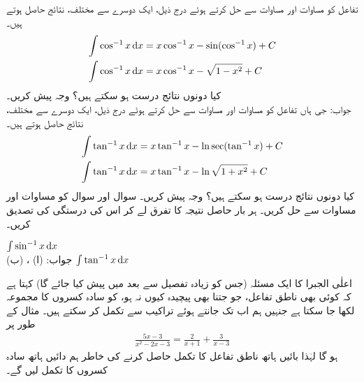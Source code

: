 تفاعل  کو مساوات  اور مساوات  سے حل کرتے ہوئے درج ذیل، ایک دوسرے سے مختلف، نتائج حاصل ہوتے ہیں۔
\begin{gather}
\begin{aligned}
\int \cos^{-1}x\dif x&=x\cos^{-1}x-\sin(\cos^{-1} x)+C\\
\int \cos^{-1}x\dif x&=x\cos^{-1}x-\sqrt{1-x^2}+C
\end{aligned}
\end{gather}
کیا دونوں نتائج درست ہو سکتے ہیں؟ وجہ پیش کریں۔\\
جواب:\quad
جی ہاں
تفاعل  کو مساوات  اور مساوات  سے حل کرتے ہوئے درج ذیل، ایک دوسرے سے مختلف، نتائج حاصل ہوتے ہیں۔
\begin{gather}
\begin{aligned}
\int \tan^{-1}x\dif x&=x\tan^{-1}x-\ln\sec(\tan^{-1}x)+C\\
\int \tan^{-1}x\dif x&=x\tan^{-1}x-\ln{\sqrt{1+x^2}}+C
\end{aligned}
\end{gather}
کیا دونوں نتائج درست ہو سکتے ہیں؟ وجہ پیش کریں۔
سوال  اور سوال  کو مساوات  اور مساوات  سے حل کریں۔ ہر بار حاصل نتیجہ کا تفرق لے کر اس کی درستگی کی تصدیق کریں۔

$\int \sin^{-1}x\dif x$\\
جواب:\quad
(ا) ، (ب) 
$\int \tan^{-1}x\dif x$

اعلٰی الجبرا کا ایک مسئلہ (جس کو زیادہ تفصیل سے بعد میں پیش کیا جائے گا) کہتا ہے کہ کوئی بھی ناطق تفاعل، جو جتنا بھی پیچیدہ کیوں نہ ہو، کو سادہ کسروں کا مجموعہ لکھا جا سکتا ہے جنہیں ہم اب تک جانتے ہوئے تراکیب سے تکمل کر سکتے ہیں۔ مثال کے طور پر
\begin{align}\label{مساوات_طریقہ_جزوی_کسر_الف}
\frac{5x-3}{x^2-2x-3}=\frac{2}{x+1}+\frac{3}{x-3}
\end{align}
ہو گا لہٰذا بائیں ہاتھ ناطق تفاعل کا تکمل حاصل کرنے کی خاطر ہم دائیں ہاتھ سادہ کسروں کا تکمل لیں گے۔

